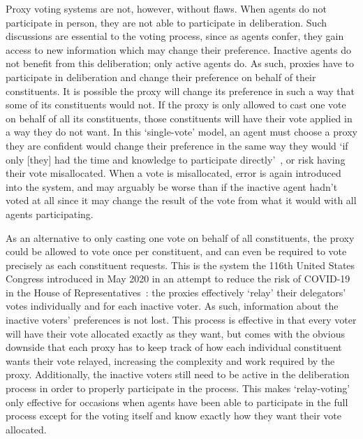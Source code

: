 {Proxy voting systems are not, however, without flaws.
When agents do not participate in person, they are not able to participate in
deliberation.
Such discussions are essential to the voting process, since as agents confer, they
gain access to new information which may change their preference.
Inactive agents do not benefit from this deliberation;
only active agents do.
As such, proxies have to participate in deliberation and change their preference on
behalf of their constituents.
It is possible the proxy will change its preference in such a way that some of its
constituents would not.
If the proxy is only allowed to cast one vote on behalf of all its constituents, those
constituents will have their vote applied in a way they do not want.
In this `single-vote'  model, an agent must choose a proxy they are confident would
change their preference in the same way they would `if only [they] had the time and
knowledge to participate directly'~\cite{Miller1969}, or risk having their vote
misallocated.
When a vote is misallocated, error is again introduced into the system, and may
arguably be worse than if the inactive agent hadn't voted at all since it may change
the result of the vote from what it would with all agents participating.

As an alternative to only casting one vote on behalf of all constituents, the proxy
could be allowed to vote once per constituent, and can even be required to vote
precisely as each constituent requests.
This is the system the 116th United States Congress introduced in May 2020 in an
attempt to reduce the risk of COVID-19 in the House of
Representatives~\cite{CERP2020, Congress.gov2020}: the proxies effectively `relay' their
delegators' votes individually and for each inactive voter.
As such, information about the inactive voters' preferences is not lost.
This process is effective in that every voter will have their vote allocated exactly
as they want, but comes with the obvious downside that each proxy has to keep track
of how each individual constituent wants their vote relayed, increasing the
complexity and work required by the proxy.
Additionally, the inactive voters still need to be active in the deliberation process
in order to properly participate in the process.
This makes `relay-voting' only effective for occasions when agents have been able to
participate in the full process except for the voting itself and know exactly how
they want their vote allocated.

}
